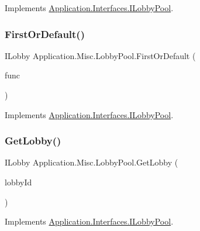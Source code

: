 Implements \mbox{\hyperlink{interface_application_1_1_interfaces_1_1_i_lobby_pool_ac64adf71b4ab967725dec520bab627c3}{Application.\+Interfaces.\+I\+Lobby\+Pool}}.

\mbox{\label{class_application_1_1_misc_1_1_lobby_pool_a5676f006bc10c46224c1b3bb266702a3}} 
\subsubsection{\texorpdfstring{First\+Or\+Default()}{FirstOrDefault()}}
{\footnotesize\ttfamily I\+Lobby Application.\+Misc.\+Lobby\+Pool.\+First\+Or\+Default (\begin{DoxyParamCaption}\item[{Func$<$ I\+Lobby, bool $>$}]{func }\end{DoxyParamCaption})}



Implements \mbox{\hyperlink{interface_application_1_1_interfaces_1_1_i_lobby_pool_aa518351cc8b58ef5997f7ecef19633bb}{Application.\+Interfaces.\+I\+Lobby\+Pool}}.

\mbox{\label{class_application_1_1_misc_1_1_lobby_pool_a61b2a303bd4bc1e72e31b3ee3d1e06d5}} 
\subsubsection{\texorpdfstring{Get\+Lobby()}{GetLobby()}}
{\footnotesize\ttfamily I\+Lobby Application.\+Misc.\+Lobby\+Pool.\+Get\+Lobby (\begin{DoxyParamCaption}\item[{string}]{lobby\+Id }\end{DoxyParamCaption})}



Implements \mbox{\hyperlink{interface_application_1_1_interfaces_1_1_i_lobby_pool_a044d19c090cbd70a17de4b487fd6d613}{Application.\+Interfaces.\+I\+Lobby\+Pool}}.

